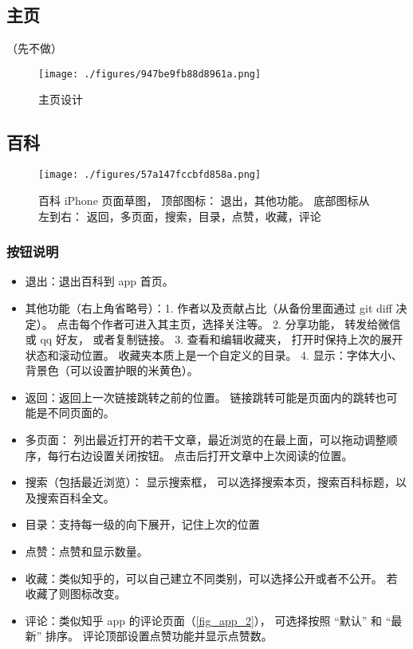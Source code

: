 
\begin{issues}
\issueDraft
\end{issues}

\subsection{主页}

（先不做）
\begin{figure}[ht]
\centering
\texttt{[image: ./figures/947be9fb88d8961a.png]}
\caption{主页设计} \label{fig_app_3}
\end{figure}

\subsection{百科}
\begin{figure}[ht]
\centering
\texttt{[image: ./figures/57a147fccbfd858a.png]}
\caption{百科 iPhone 页面草图， 顶部图标： 退出，其他功能。 底部图标从左到右： 返回，多页面，搜索，目录，点赞，收藏，评论}\label{fig_app_1}
\end{figure}

\subsubsection{按钮说明}
\begin{itemize}
\item 退出：退出百科到 app 首页。
\item 其他功能（右上角省略号）：1. 作者以及贡献占比（从备份里面通过 git diff 决定）。 点击每个作者可进入其主页，选择关注等。 2. 分享功能， 转发给微信或 qq 好友， 或者复制链接。 3. 查看和编辑收藏夹， 打开时保持上次的展开状态和滚动位置。 收藏夹本质上是一个自定义的目录。 4. 显示：字体大小、 背景色（可以设置护眼的米黄色）。
\item 返回：返回上一次链接跳转之前的位置。 链接跳转可能是页面内的跳转也可能是不同页面的。
\item 多页面： 列出最近打开的若干文章，最近浏览的在最上面，可以拖动调整顺序，每行右边设置关闭按钮。 点击后打开文章中上次阅读的位置。
\item 搜索（包括最近浏览）： 显示搜索框， 可以选择搜索本页，搜索百科标题，以及搜索百科全文。
\item 目录：支持每一级的向下展开，记住上次的位置
\item 点赞：点赞和显示数量。
\item 收藏：类似知乎的，可以自己建立不同类别，可以选择公开或者不公开。 若收藏了则图标改变。
\item 评论：类似知乎 app 的评论页面（\autoref{fig_app_2}）， 可选择按照 “默认” 和 “最新” 排序。 评论顶部设置点赞功能并显示点赞数。
\end{itemize}

